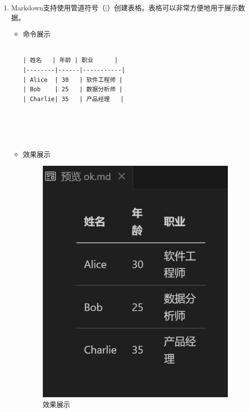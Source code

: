 \documentclass[UTF8]{ctexart}
\begin{document}
\begin{enumerate}
  \item Markdown支持使用管道符号（|）创建表格。表格可以非常方便地用于展示数据。


  \begin{itemize}
  \item 命令展示
  \begin{verbatim}

| 姓名   | 年龄 | 职业      |
|--------|------|-----------|
| Alice  | 30   | 软件工程师 |
| Bob    | 25   | 数据分析师 |
| Charlie| 35   | 产品经理   |





  \end{verbatim}
\item 效果展示
 
\begin{figure}[H]
    \centering
    \includegraphics[width=\textwidth]{4.1} %
    \caption{效果展示}
  \end{figure}
  \end{itemize}
\end{enumerate}
\end{document}
